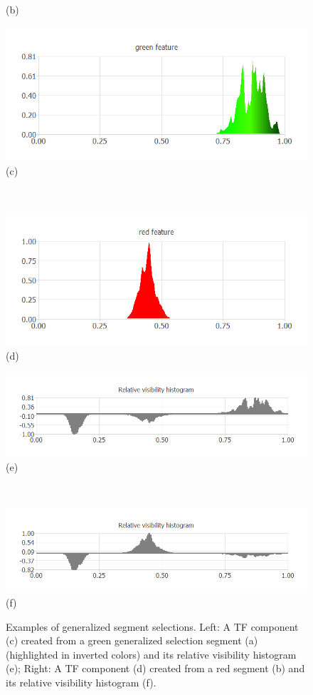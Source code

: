 \documentclass[twoside,twocolumn,10pt]{article}
\begin{document}
\begin{figure}
\begin{minipage}{.2\textwidth}
(b)
	\end{minipage}
	\begin{minipage}{.245\textwidth}
		\centering
		\includegraphics[width=1\linewidth]{nucleon_green_segment}
(c)
	\end{minipage}~
	\begin{minipage}{.245\textwidth}
		\centering
		\includegraphics[width=1\linewidth]{nucleon_red_segment}
(d)
	\end{minipage}
	\begin{minipage}{.245\textwidth}
		\centering
		\includegraphics[width=1\linewidth]{nucleon_green_segment_Relative_visibility_histogram}
(e)
	\end{minipage}~
	\begin{minipage}{.245\textwidth}
		\centering
		\includegraphics[width=1\linewidth]{nucleon_red_segment_Relative_visibility_histogram}
(f)
	\end{minipage}
	\caption{Examples of generalized segment selections. Left: A TF component (c) created from a green generalized selection segment (a) (highlighted in inverted colors) and its relative visibility histogram (e); Right: A TF component (d) created from a red segment (b) and its relative visibility histogram (f).}
	\label{fig:nucleon_segments}
\end{figure}
\end{document}
